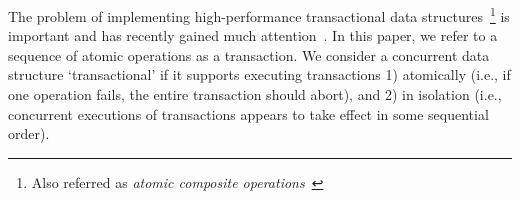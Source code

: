 \documentclass[10pt,conference,compsocconf]{IEEEtran}
\begin{document}
The problem of implementing high-performance transactional data structures~\footnote{Also referred as \emph{atomic composite operations}~\cite{golan2013concurrent}} is important and has recently gained much attention~\cite{golan2013concurrent,bronson2010transactional,herlihy2008transactional,gramoli2013composing,golan2015automatic,hassan2014integrating,koskinen2010coarse}. 
In this paper, we refer to a sequence of atomic operations as a transaction.
We consider a concurrent data structure `transactional' if it supports executing transactions 1) atomically (i.e., if one operation fails, the entire transaction should abort), and 2) in isolation (i.e., concurrent executions of transactions appears to take effect in some sequential order).
\end{document}
